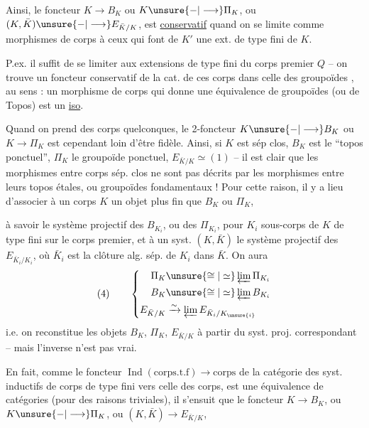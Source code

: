 Ainsi, le foncteur $K\longrightarrow B_K$ ou $K\unsure{-|\longrightarrow}\Pi_K$, ou $(K,\bar K)\unsure{-|\longrightarrow}E_{\bar K/K}$, est \uline{conservatif} quand on se limite comme morphismes de corps  à ceux  qui font de $K'$ une ext. de type fini de $K$.

P.ex. il suffit de se limiter aux extensions de type fini du corps premier $Q$ -- on trouve un foncteur conservatif de la cat. de ces corps dans celle des groupoïdes , au sens : un morphisme de corps qui donne une équivalence de groupoïdes (ou de Topos) est un \uline{iso}.


Quand on prend des corps quelconques, le 2-foncteur $K\unsure{-|\longrightarrow}B_K$ ou $K\longrightarrow\Pi_K$  est cependant loin d'être fidèle. Ainsi, si $K$ est sép clos, $B_K$ est le ``topos ponctuel'', $\Pi_K$ le groupoïde ponctuel, $E_{\bar K/K}\simeq(1)$ -- il est clair que les morphismes entre corps sép. clos ne sont pas décrits par les morphismes entre leurs topos étales, ou groupoïdes fondamentaux ! Pour cette raison, il y a lieu d'associer à un corps $K$ un objet plus fin que $B_K$ ou $\Pi_K$,

à savoir le système projectif des $B_{K_i}$, ou des $\Pi_{K_i}$, pour $K_i$ sous-corps de $K$ de type fini sur le corps premier, et à un syst. $(K,\bar K)$ le système projectif des $E_{\bar K_i/K_i}$, où $\bar K_i$ est la clôture alg. sép. de $K_i$ dans $\bar K$. On aura
\[
(4)\qquad\left\{\begin{aligned}
\Pi_K&\unsure{\cong|\simeq}\varprojlim\Pi_{K_i}\\
B_K&\unsure{\cong|\simeq}\varprojlim B_{K_i}\\
E_{\bar K/K}&\xrightarrow{\sim}\varprojlim E_{\bar K_i/K_{\unsure{i}}}
\end{aligned}\right.
\]
i.e. on reconstitue les objets $B_K$, $\Pi_K$, $E_{\bar K/K}$ à partir du syst. proj. correspondant -- mais l'inverse n'est pas vrai.

En fait, comme le foncteur $\operatorname{Ind}(\text{corps.t.f})\longrightarrow\text{corps}$ de la catégorie des syst. inductifs de corps de type fini vers celle des corps, est une équivalence de catégories (pour des raisons triviales), il s'ensuit que le foncteur $K\longrightarrow B_K$, ou $K\unsure{-|\longrightarrow}\Pi_K$, ou $(K,\bar K)\longrightarrow E_{\bar K/K}$, 

